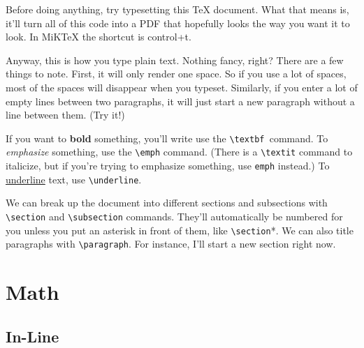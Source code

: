 \documentclass[12pt]{article}
\begin{document}
\maketitle


Before doing anything, try typesetting this TeX document. What that means is, it'll turn all of this code into a PDF that hopefully looks the way you want it to look. In MiKTeX the shortcut is control+t. 

Anyway, this is how you type plain text. Nothing fancy, right? There are a few things to note. First, it will only render one space. So if you use     a lot of spaces, most of the spaces will disappear when you typeset. Similarly, if you enter a lot of empty lines between two paragraphs, it will just start a new paragraph without a line between them. (Try it!)

If you want to \textbf{bold} something, you'll write use the \verb|\textbf |command. To \emph{emphasize} something, use the \verb|\emph| command. (There is a \verb|\textit| command to italicize, but if you're trying to emphasize something, use \verb|emph| instead.) To \underline{underline} text, use \verb|\underline|. 

We can break up the document into different sections and subsections with \verb|\section| and \verb|\subsection| commands. They'll automatically be numbered for you unless you put an asterisk in front of them, like \verb|\section|*. We can also title paragraphs with \verb|\paragraph|. For instance, I'll start a new section right now.




\section{Math}


\subsection{In-Line}
\end{document}

